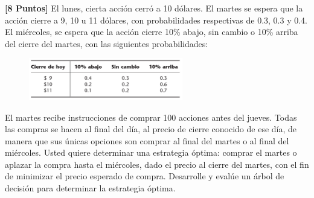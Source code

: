 \documentclass[ a4paper, twoside, 11pt]{article}
\begin{document}
\begin{problem}
\textbf{[8 Puntos]} El lunes, cierta acci\'on cerr\'o a 10 d\'olares. El martes se espera que la acci\'on cierre a 9, 10 u 11 d\'olares, con probabilidades respectivas de 0.3, 0.3 y 0.4. El mi\'ercoles, se espera que la acci\'on cierre 10\% abajo, sin cambio o 10\% arriba del cierre del martes, con las siguientes probabilidades: 

\begin{figure}[htb]
\centering
\includegraphics[width=0.6\textwidth]{problema-acciones.jpg}
\end{figure}

El martes recibe instrucciones de comprar 100 acciones antes del jueves. Todas las compras se hacen al final del d\'ia, al precio de cierre conocido de ese d\'ia, de manera que sus \'unicas opciones son comprar al final del martes o al final del mi\'ercoles. Usted quiere determinar una estrategia \'optima: comprar el martes o aplazar la compra hasta el mi\'ercoles, dado el precio al cierre del martes, con el fin de minimizar el precio esperado de compra. Desarrolle y eval\'ue un \'arbol de decisi\'on para determinar la estrategia \'optima. 
\end{problem}
\fullskip
\end{document}
